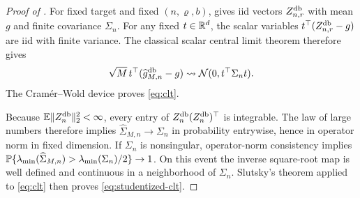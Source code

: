 \begin{proof}[Proof of ]
For fixed target and fixed $(n,\varrho,b)$,  gives iid vectors $Z_{n,r}^{\mathrm{db}}$ with mean $g$ and finite covariance $\Sigma_n$.  For any fixed $t\in\mathbb R^d$, the scalar variables
$t^\top(Z_{n,r}^{\mathrm{db}}-g)$ are iid with finite variance.  The classical scalar central limit theorem therefore gives
\[
 \sqrt M\,t^\top(\widehat g_{M,n}^{\mathrm{db}}-g)
 \rightsquigarrow \mathcal N(0,t^\top\Sigma_nt).
\]
The Cram\'er--Wold device proves \eqref{eq:clt}.

Because $\mathbb E\lVert Z_n^{\mathrm{db}}\rVert_2^2<\infty$, every entry of $Z_n^{\mathrm{db}}(Z_n^{\mathrm{db}})^\top$ is integrable.  The law of large numbers therefore implies
$\widehat\Sigma_{M,n}\to\Sigma_n$ in probability entrywise, hence in operator norm in fixed dimension.  If $\Sigma_n$ is nonsingular, operator-norm consistency implies
$\mathbb P\{\lambda_{\min}(\widehat\Sigma_{M,n})>\lambda_{\min}(\Sigma_n)/2\}\to1$.
On this event the inverse square-root map is well defined and continuous in a neighborhood of $\Sigma_n$.  Slutsky's theorem applied to \eqref{eq:clt} then proves \eqref{eq:studentized-clt}.
\end{proof}
